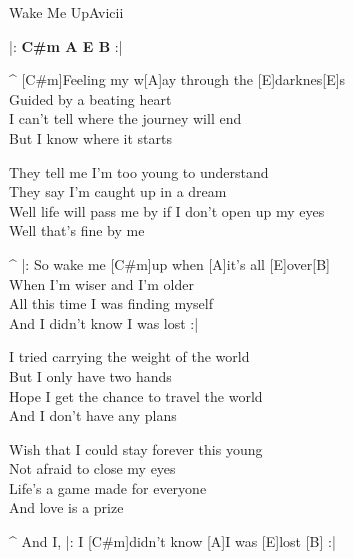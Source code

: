 \vspace{-2mm}
\begin{song}{Wake Me Up}{Avicii}

\vspace{-2mm}
\begin{guitar}
|: \textbf{C#m  A   E   B} :|\\
\end{guitar}

\begin{guitar}
^ [C#m]Feeling my w[A]ay through the [E]darknes[E]s\\
Guided by a beating heart\\
I can’t tell where the journey will end\\
But I know where it starts\\
\end{guitar}

\begin{guitar}
They tell me I’m too young to understand\\
They say I’m caught up in a dream\\
Well life will pass me by if I don’t open up my eyes\\
Well that’s fine by me\\
\end{guitar}

\begin{guitar}
^ |: So wake me [C#m]up when [A]it’s all [E]over[B]\\
When I’m wiser and I’m older\\
All this time I was finding myself\\
And I didn’t know I was lost :|\\
\end{guitar}

\begin{guitar}
I tried carrying the weight of the world\\
But I only have two hands\\
Hope I get the chance to travel the world\\
And I don’t have any plans\\
\end{guitar}

\begin{guitar}
Wish that I could stay forever this young\\
Not afraid to close my eyes\\
Life’s a game made for everyone\\
And love is a prize\\
\end{guitar}



\begin{guitar}
^ And I, |: I [C#m]didn’t know [A]I was [E]lost  [B] :|\\
\end{guitar}

\end{song}
